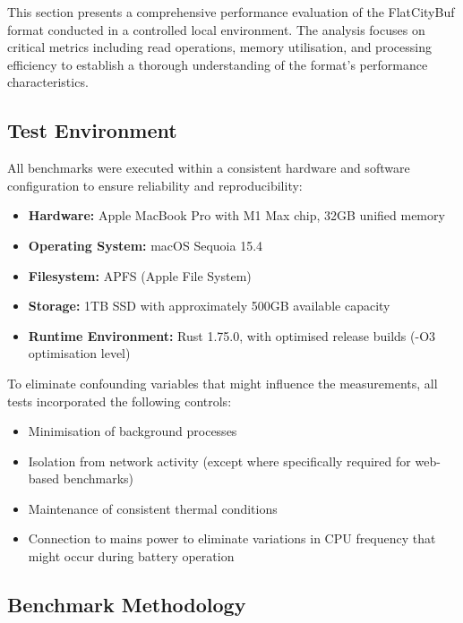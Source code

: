 This section presents a comprehensive performance evaluation of the FlatCityBuf format conducted in a controlled local environment. The analysis focuses on critical metrics including read operations, memory utilisation, and processing efficiency to establish a thorough understanding of the format's performance characteristics.

\subsection{Test Environment}
\label{result:benchmark_on_local_environment:test_environment}

All benchmarks were executed within a consistent hardware and software configuration to ensure reliability and reproducibility:

\begin{itemize}
  \item \textbf{Hardware:} Apple MacBook Pro with M1 Max chip, 32GB unified memory
  \item \textbf{Operating System:} macOS Sequoia 15.4
  \item \textbf{Filesystem:} APFS (Apple File System)
  \item \textbf{Storage:} 1TB SSD with approximately 500GB available capacity
  \item \textbf{Runtime Environment:} Rust 1.75.0, with optimised release builds (-O3 optimisation level)
\end{itemize}

To eliminate confounding variables that might influence the measurements, all tests incorporated the following controls:
\begin{itemize}
  \item Minimisation of background processes
  \item Isolation from network activity (except where specifically required for web-based benchmarks)
  \item Maintenance of consistent thermal conditions
  \item Connection to mains power to eliminate variations in CPU frequency that might occur during battery operation
\end{itemize}

\subsection{Benchmark Methodology}
\label{result:benchmark_on_local_environment:benchmark_methodology}


